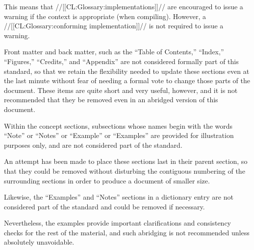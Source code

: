 This means that //[[CL:Glossary:implementations]]// are encouraged to issue a warning
if the context is appropriate (\eg when compiling).  However, a
//[[CL:Glossary:conforming implementation]]// is not required to issue a warning.

























\endlist

\endsubSection%





Front matter and back matter, such as the ``Table of Contents,'' 
``Index,'' ``Figures,'' ``Credits,'' and ``Appendix'' are not considered formally 
part of this standard, so that we retain the flexibility needed to update
these sections even at the last minute without fear of needing a formal 
vote to change those parts of the document.  These items are quite short 
and very useful, however, and it is not recommended that they be removed 
even in an abridged version of this document.

Within the concept sections, subsections whose names begin with 
the words ``Note'' or ``Notes'' or ``Example'' or ``Examples'' 
are provided for illustration purposes only, and are not considered
part of the standard.

An attempt has been made to place these sections last in their parent section,
so that they could be removed without disturbing the contiguous numbering of the 
surrounding sections in order to produce a document of smaller size.

Likewise, the ``Examples'' and ``Notes'' sections in a dictionary entry
are not considered part of the standard and could be removed if necessary.

Nevertheless, the examples provide important clarifications and consistency 
checks for the rest of the material, and such abridging is not recommended
unless absolutely unavoidable.

\endsubsection%

